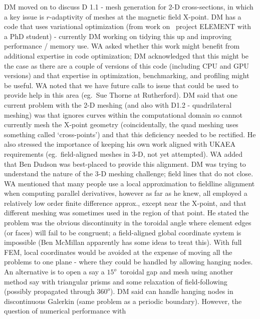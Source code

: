 DM moved on to discuss D 1.1 - mesh generation for 2-D cross-sections, in which 
a key issue is $r$-adaptivity of meshes at the magnetic field X-point.  DM has a 
code that uses variational optimization (from work on \exc\ project ELEMENT with a PhD 
student) - currently DM working on tidying this up and improving performance / 
memory use.  WA asked whether this work might benefit from additional expertise 
in code optimization; DM acknowledged that this might be the case as there are 
a couple of versions of this code (including CPU and GPU versions) and that 
expertise in optimization, benchmarking, and profiling might be useful.  WA 
noted that we have future calls to issue that could be used to provide help in 
this area (eg.\ Sue Thorne at Rutherford).  DM said that one current problem 
with the 2-D meshing (and also with D1.2 - quadrilateral meshing) was that 
 ignores curves within the computational domain so cannot currently 
mesh the X-point geometry (coincidentally, the quad meshing uses something 
called `cross-points') and that this deficiency needed to be rectified.  He 
also stressed the importance of keeping his own work aligned with UKAEA 
requirements (eg.\ field-aligned meshes in 3-D, not yet attempted).  WA added 
that Ben Dudson was best-placed to provide this alignment.  DM was trying to 
understand the nature of the 3-D meshing challenge; field lines that do not 
close.  WA mentioned that many people use a local approximation
to fieldline alignment when computing parallel derivatives, however as
far as he knew, all employed a relatively low order finite difference approx.,
except near the X-point, and that different meshing was 
sometimes used in the region of that point.  He stated the problem was the 
obvious discontinuity in the toroidal angle where element edges (or faces) will 
fail to be congruent; a field-aligned global coordinate system is impossible 
(Ben McMillan apparently has some ideas to treat this).  With full FEM, local 
coordinates would be avoided at the expense of moving all the problems to one plane - 
where they could be handled by allowing hanging nodes.  An alternative is to open a 
say a $15^o$~toroidal gap and mesh using another method say with triangular prisms
and some relaxation of field-following (possibly propagated through $360^o$).  DM said 
 can handle hanging nodes in discontinuous Galerkin (same problem 
as a periodic boundary).  However, the question of numerical performance with 
